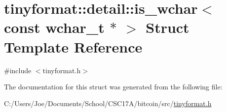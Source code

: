 \hypertarget{structtinyformat_1_1detail_1_1is__wchar_3_01const_01wchar__t_01_5_01_4}{}\section{tinyformat\+:\+:detail\+:\+:is\+\_\+wchar$<$ const wchar\+\_\+t $\ast$ $>$ Struct Template Reference}
\label{structtinyformat_1_1detail_1_1is__wchar_3_01const_01wchar__t_01_5_01_4}


{\ttfamily \#include $<$tinyformat.\+h$>$}



The documentation for this struct was generated from the following file\+:\begin{DoxyCompactItemize}
\item 
C\+:/\+Users/\+Joe/\+Documents/\+School/\+C\+S\+C17\+A/bitcoin/src/\hyperlink{tinyformat_8h}{tinyformat.\+h}\end{DoxyCompactItemize}
